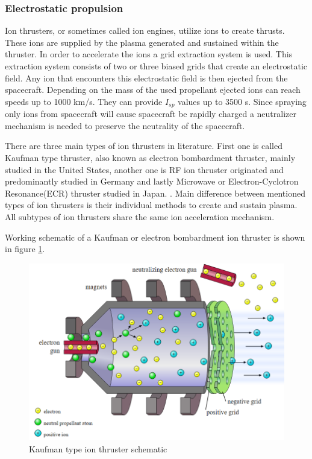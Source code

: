 \subsubsection{Electrostatic propulsion}
Ion thrusters, or sometimes called ion engines, utilize ions to create thrusts. These ions are supplied by the plasma generated and sustained within the thruster. In order to accelerate the ions a grid extraction system is used. This extraction system consists of two or three biased grids that create an electrostatic field. Any ion that encounters this electrostatic field is then ejected from the spacecraft. Depending on the mass of the used propellant ejected ions can reach speeds up to 1000 km/s\cite{goebel2008fundamentals}. They can provide $I_{sp}$ values up to 3500 s\cite{Calik2011}. Since spraying only ions from spacecraft will cause spacecraft be rapidly charged a neutralizer mechanism is needed to preserve the neutrality of the spacecraft.
\par There are three main types of ion thrusters in literature. First one is called Kaufman type thruster, also known as electron bombardment thruster, mainly studied in the United States, another one is RF ion thruster originated and predominantly studied in Germany and lastly Microwave or Electron-Cyclotron Resonance(ECR) thruster studied in Japan\cite{kokal2017design}\cite{OCW1964}\cite{Bumbarger}.
. Main difference between mentioned types of ion thrusters is their individual methods to create and sustain plasma. All subtypes of ion thrusters share the same ion acceleration mechanism. 

\par Working schematic of a Kaufman or electron bombardment ion thruster is shown in figure \ref{fig:kaufman}.

\begin{figure}[ht]
    \centering
    \includegraphics[scale=0.9]{fig/kaufman.png}
    \caption[Kaufman type ion thruster schematic]{Kaufman type ion thruster schematic\cite{kaufman}}
    \label{fig:kaufman}
\end{figure}

